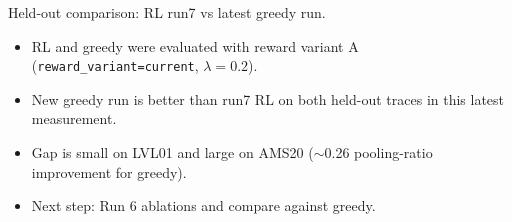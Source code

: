 \documentclass[11pt,aspectratio=43]{beamer}
\begin{document}
\begin{frame}{Held-out comparison: RL run7 vs latest greedy run.}

  \small
  \begin{center}
  \end{center}

  \vspace{0.65em}
  \begin{itemize}
    \setlength{\itemsep}{0.55em}
    \item RL and greedy were evaluated with reward variant A (\texttt{reward\_variant=current}, \(\lambda=0.2\)).
    \item New greedy run is better than run7 RL on both held-out traces in this latest measurement.
    \item Gap is small on LVL01 and large on AMS20 (\(\sim\)0.26 pooling-ratio improvement for greedy).
    \item Next step: Run 6 ablations and compare against greedy.
  \end{itemize}

\end{frame}
\end{document}
